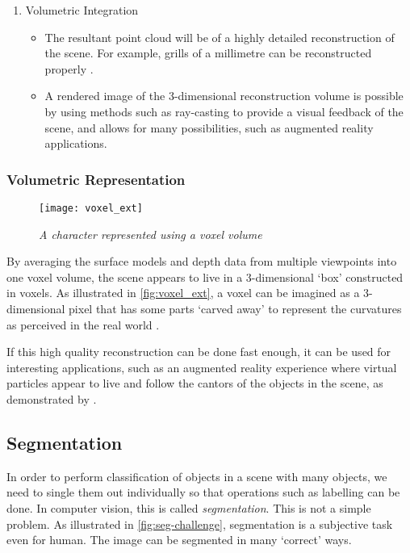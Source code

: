 \begin{enumerate}
  \item Volumetric Integration
    \begin{itemize}
      \item The resultant point cloud will be of a highly detailed reconstruction of the scene. For example, grills of a millimetre can be reconstructed properly \cite{ms-3d-paper}.
      \item A rendered image of the 3-dimensional reconstruction volume is possible by using methods such as ray-casting to provide a visual feedback of the scene, and allows for many possibilities, such as augmented reality applications.
    \end{itemize}
\end{enumerate}


\subsubsection{Volumetric Representation}

\begin{figure}[h]
  \centering
  \texttt{[image: voxel\_ext]}
  \caption{\textit{A character represented using a voxel volume}\protect\footnotemark}
  \label{fig:voxel_ext}
\end{figure}

By averaging the surface models and depth data from multiple viewpoints into one voxel volume, the scene appears to live in a 3-dimensional `box' constructed in voxels. As illustrated in \autoref{fig:voxel_ext}, a voxel can be imagined as a 3-dimensional pixel that has some parts `carved away' to represent the curvatures as perceived in the real world \cite{szeliski-book}.

If this high quality reconstruction can be done fast enough, it can be used for interesting applications, such as an augmented reality experience where virtual particles appear to live and follow the cantors of the objects in the scene, as demonstrated by . 

\subsection{Segmentation}
In order to perform classification of objects in a scene with many objects, we need to single them out individually so that operations such as labelling can be done. In computer vision, this is called \textit{segmentation}. This is not a simple problem. As illustrated in \autoref{fig:seg-challenge}, segmentation is a subjective task even for human. The image can be segmented in many `correct' ways.


